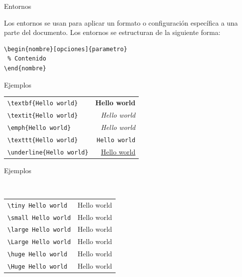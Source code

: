 \begin{frame}[fragile]{Entornos}

Los entornos se usan para aplicar un formato o configuración específica a una
parte del documento. Los entornos se estructuran de la siguiente forma:

\begin{lstlisting}
\begin{nombre}[opciones]{parametro}
 % Contenido
\end{nombre}
\end{lstlisting}

\end{frame}

\begin{frame}{Ejemplos}

\begin{center}
\begin{tabular}{lr}
  \texttt{\textbackslash textbf\{Hello world\}} & \textbf{Hello world} \\[3mm]
  \texttt{\textbackslash textit\{Hello world\}} & \textit{Hello world} \\[3mm]
  \texttt{\textbackslash emph\{Hello world\}} & \emph{Hello world} \\[3mm]
  \texttt{\textbackslash texttt\{Hello world\}} & \texttt{Hello world} \\[3mm]
  \texttt{\textbackslash underline\{Hello world\}} & \underline{Hello world} \\[3mm]
\end{tabular}
\end{center}

\end{frame}

\begin{frame}{Ejemplos}
\begin{center}
\color{red}\color{black}\\[5mm]

\begin{tabular}{lr}
  \texttt{\textbackslash tiny Hello world} & \tiny Hello world \\
  \texttt{\textbackslash small Hello world} & \small Hello world \\
  \texttt{\textbackslash large Hello world} & \large Hello world \\
  \texttt{\textbackslash Large Hello world} & \Large Hello world \\
  \texttt{\textbackslash huge Hello world} & \huge Hello world \\
  \texttt{\textbackslash Huge Hello world} & \Huge Hello world
\end{tabular}
\end{center}
\end{frame}

